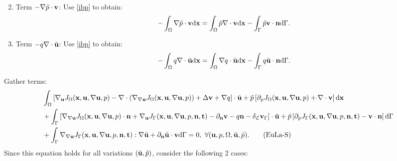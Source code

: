 \documentclass[oneside]{book}
\numberwithin{equation}{section}
\begin{document}
\begin{enumerate}
\begin{align*}
    \end{align*}
    \item Term $-\nabla\tilde{p}\cdot{\bf v}$: Use \eqref{ibp} to obtain:
    \begin{align*}
        -\int_\Omega \nabla\tilde{p}\cdot{\bf v}{\rm d}{\bf x} = \int_\Omega \tilde{p}\nabla\cdot{\bf v}{\rm d}{\bf x} - \int_\Gamma \tilde{p}{\bf v}\cdot{\bf n}{\rm d}\Gamma.
    \end{align*}
    \item Term $-q\nabla\cdot\tilde{\bf u}$: Use \eqref{ibp} to obtain:
    \begin{align*}
        -\int_\Omega q\nabla\cdot\tilde{\bf u}{\rm d}{\bf x} = \int_\Omega \nabla q\cdot\tilde{\bf u}{\rm d}{\bf x} - \int_\Gamma q\tilde{\bf u}\cdot{\bf n}{\rm d}\Gamma.
    \end{align*}
\end{enumerate}
Gather terms:
\begin{align}
    &\int_\Omega \left[\nabla_{\bf u}J_\Omega({\bf x},{\bf u},\nabla{\bf u},p) - \nabla\cdot(\nabla_{\nabla{\bf u}}J_\Omega({\bf x},{\bf u},\nabla{\bf u},p)) + \Delta{\bf v} + \nabla q\right]\cdot\tilde{\bf u} + \tilde{p}\left[\partial_pJ_\Omega({\bf x},{\bf u},\nabla{\bf u},p) + \nabla\cdot{\bf v}\right]{\rm d}{\bf x}\nonumber\\
    &+ \int_\Gamma \left[\nabla_{\nabla{\bf u}}J_\Omega({\bf x},{\bf u},\nabla{\bf u},p)\cdot{\bf n} + \nabla_{\bf u}J_\Gamma({\bf x},{\bf u},\nabla{\bf u},p,{\bf n},{\bf t}) - \partial_{\bf n}{\bf v} - q{\bf n} - \delta_{\mathcal{L}}{\bf v}_\Gamma\right]\cdot\tilde{\bf u} + \tilde{p}\left[\partial_pJ_\Gamma({\bf x},{\bf u},\nabla{\bf u},p,{\bf n},{\bf t}) - {\bf v}\cdot{\bf n}\right]{\rm d}\Gamma\nonumber\\
    &+ \int_\Gamma \nabla_{\nabla{\bf u}}J_\Gamma({\bf x},{\bf u},\nabla{\bf u},p,{\bf n},{\bf t}):\nabla\tilde{\bf u} + \partial_{\bf n}\tilde{\bf u}\cdot{\bf v}{\rm d}\Gamma = 0,\ \forall({\bf u},p,\Omega,\tilde{\bf u},\tilde{p}).\label{Euler-Lagrange equation for stationary Stokes}\tag{EuLa-S}
\end{align}
Since this equation holds for all variations $(\tilde{\bf u},\tilde{p})$, consider the following 2 cases:
\end{document}
